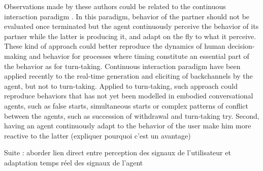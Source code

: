 Observations made by these authors could be related to the continuous interaction paradigm \citep{reidsma_continuous_2011}. In this paradigm, behavior of the partner should not be evaluated once terminated but the agent continuously perceive the behavior of its partner while the latter is producing it, and adapt on the fly to what it perceive. These kind of approach could better reproduce the dynamics of human decision-making and behavior for processes where timing constitute an essential part of the behavior as for turn-taking.
 Continuous interaction paradigm have been applied recently to the real-time generation \citep{bevacqua_multimodal_2010} and eliciting \citep{buschmeier_when_2014} of backchannels by the agent, but not to turn-taking. 
 Applied to turn-taking, such approach could reproduce behaviors that has not yet been modelled in embodied conversational agents, such as false starts, simultaneous starts or complex patterns of conflict between the agents, such as succession of withdrawal and turn-taking try. 
 Second, having an agent continuously adapt to the behavior of the user make him more reactive to the latter (expliquer pourquoi c'est un avantage)
 
 Suite : aborder lien direct entre perception des signaux de l'utilisateur et adaptation temps réel des signaux de l'agent
   
% 
% 




